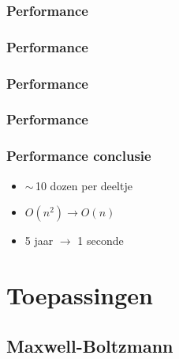 \documentclass{beamer}
\newcommand{\figscale}[2]{
	\begin{center}
	\scalebox{#1}{
		
	}
	\end{center}
}
\begin{document}
\begin{frame}
\frametitle{Performance}
\figscale{0.8}{idealNboxR0p5}
\end{frame}

\begin{frame}
\frametitle{Performance}
\figscale{0.8}{idealNboxR0p1-1M}
\end{frame}

\begin{frame}
\frametitle{Performance}
\figscale{0.8}{linearComplexityR0p5}
\end{frame}

\begin{frame}
\frametitle{Performance}
\figscale{0.8}{linearComplexityR0p1-1M}
\end{frame}

\begin{frame}
\frametitle{Performance conclusie}
\begin{itemize}
\item $\sim$\,10 dozen per deeltje
\item $O(n^2) \rightarrow O(n)$
\item 5 jaar $\rightarrow$ 1 seconde
\end{itemize}
\end{frame}

\section{Toepassingen}
\subsection{Maxwell-Boltzmann}
\begin{frame}

\end{frame}
\end{document}
